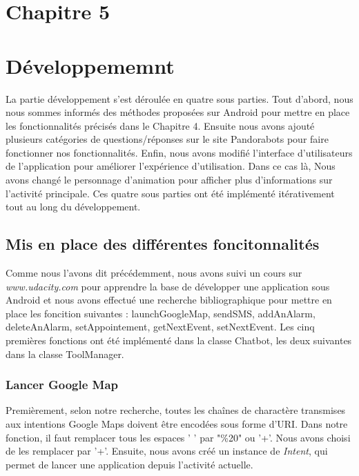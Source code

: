 \section*{Chapitre 5}
\section{Développememnt}
	La partie développement s'est déroulée en quatre sous parties. Tout d'abord, nous nous sommes informés des méthodes proposées sur Android pour mettre en place les fonctionnalités précisés dans le Chapitre 4. Ensuite nous avons ajouté plusieurs catégories de questions/réponses sur le site Pandorabots pour faire fonctionner nos fonctionnalités. Enfin, nous avons modifié l'interface d'utilisateurs de l'application pour améliorer l'expérience d'utilisation. Dans ce cas là, Nous avons changé le personnage d'animation pour afficher plus d'informations sur l'activité principale. Ces quatre sous parties ont été implémenté itérativement tout au long du développement.\\

\subsection{Mis en place des différentes foncitonnalités}
	
\indent Comme nous l'avons dit précédemment, nous avons suivi un cours sur \emph{www.udacity.com} pour apprendre la base de développer une application sous Android et nous avons effectué une recherche bibliographique pour mettre en place les foncition suivantes : launchGoogleMap, sendSMS, addAnAlarm, deleteAnAlarm, setAppointement, getNextEvent, setNextEvent. Les cinq premières fonctions ont été implémenté dans la classe Chatbot, les deux suivantes dans la classe ToolManager.\\

\subsubsection{Lancer Google Map}

\indent Premièrement, selon notre recherche, toutes les chaînes de charactère transmises aux intentions Google Maps doivent être encodées sous forme d'URI. Dans notre fonction, il faut remplacer tous les espaces ' ' par "\%20" ou '+'. Nous avons choisi de les remplacer par '+'. Ensuite, nous avons créé un instance de \emph{Intent}, qui permet de lancer une application depuis l'activité actuelle. \\


